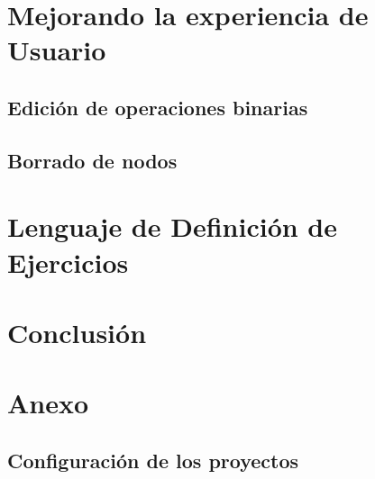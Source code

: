 


\section{Mejorando la experiencia de Usuario}\label{usabilidad}

\subsection{Edición de operaciones binarias}

\subsection{Borrado de nodos}

\section{Lenguaje de Definición de Ejercicios}\label{proyecto}

\section{Conclusión}\label{conclusion}

\section{Anexo}\label{anexo}

\subsection{Configuración de los proyectos}

